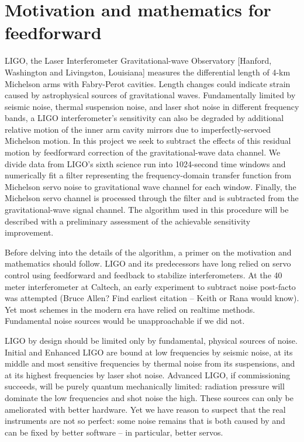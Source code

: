     \section{Motivation and mathematics for feedforward}
    \label{motive_math}

LIGO, the Laser Interferometer Gravitational-wave Observatory [Hanford, Washington and Livingston, Louisiana] measures the differential length of 4-km Michelson arms with Fabry-Perot cavities. Length changes could indicate strain caused by astrophysical sources of gravitational waves. Fundamentally limited by seismic noise, thermal suspension noise, and laser shot noise in different frequency bands, a LIGO interferometer's sensitivity can also be degraded by additional relative motion of the inner arm cavity mirrors due to imperfectly-servoed Michelson motion. In this project we seek to subtract the effects of this residual motion by feedforward correction of the gravitational-wave data channel. We divide data from LIGO's sixth science run into 1024-second time windows and numerically fit a filter representing the frequency-domain transfer function from Michelson servo noise to gravitational wave channel for each window. Finally, the Michelson servo channel is processed through the filter and is subtracted from the gravitational-wave signal channel. The algorithm used in this procedure will be described with a preliminary assessment of the achievable sensitivity improvement.

        Before delving into the details of the algorithm, a primer on the motivation and mathematics should follow. LIGO and its predecessors have long relied on servo control using feedforward and feedback to stabilize interferometers. At the 40 meter interferometer at Caltech, an early experiment to subtract noise post-facto was attempted (Bruce Allen? Find earliest citation -- Keith or Rana would know). Yet most schemes in the modern era have relied on realtime methods. Fundamental noise sources would be unapproachable if we did not.

        LIGO by design should be limited only by fundamental, physical sources of noise. Initial and Enhanced LIGO are bound at low frequencies by seismic noise, at its middle and most sensitive frequencies by thermal noise from its suspensions, and at its highest frequencies by laser shot noise. Advanced LIGO, if commissioning succeeds, will be purely quantum mechanically limited: radiation pressure will dominate the low frequencies and shot noise the high. These sources can only be ameliorated with better hardware. Yet we have reason to suspect that the real instruments are not so perfect: some noise remains that is both caused by and can be fixed by better software -- in particular, better servos.  

